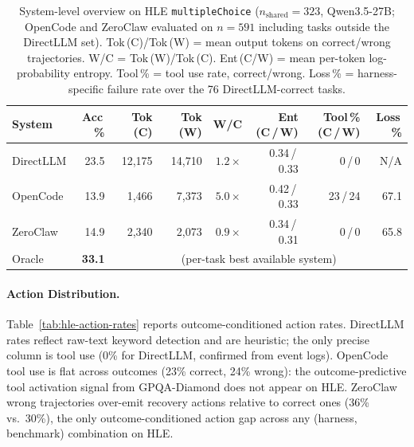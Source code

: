 \begin{table}[t]
\centering
\small
\caption{%
  System-level overview on HLE \texttt{multipleChoice} ($n_{\text{shared}}=323$,
  Qwen3.5-27B; OpenCode and ZeroClaw evaluated on $n=591$ including tasks
  outside the DirectLLM set).
  Tok\,(C)/Tok\,(W) = mean output tokens on correct/wrong trajectories.
  W/C = Tok\,(W)/Tok\,(C).
  Ent\,(C/W) = mean per-token log-probability entropy.
  Tool\,\% = tool use rate, correct/wrong.
  Loss\,\% = harness-specific failure rate over the 76 DirectLLM-correct tasks.
}
\label{tab:hle-overview}
\setlength{\tabcolsep}{3pt}
\begin{tabular}{lrrrrrrr}
\toprule
System & Acc\,\% & Tok (C) & Tok (W) & W/C & Ent (C\,/\,W) & Tool\,\% (C\,/\,W) & Loss\,\% \\
\midrule
DirectLLM &  23.5 & 12{,}175 & 14{,}710 & $1.2{\times}$ & 0.34\,/\,0.33 & 0\,/\,0    & N/A  \\
OpenCode  &  13.9 &  1{,}466 &  7{,}373 & $5.0{\times}$ & 0.42\,/\,0.33 & 23\,/\,24  & 67.1 \\
ZeroClaw  &  14.9 &  2{,}340 &  2{,}073 & $0.9{\times}$ & 0.34\,/\,0.31 & 0\,/\,0    & 65.8 \\
\midrule
Oracle    &  \textbf{33.1} & \multicolumn{6}{c}{(per-task best available system)} \\
\bottomrule
\end{tabular}
\end{table}

\paragraph{Action Distribution.}
Table~\ref{tab:hle-action-rates} reports outcome-conditioned action rates.
DirectLLM rates reflect raw-text keyword detection and are heuristic;
the only precise column is tool use (0\% for DirectLLM, confirmed from
event logs).
OpenCode tool use is flat across outcomes (23\% correct, 24\% wrong): the
outcome-predictive tool activation signal from GPQA-Diamond does not appear
on HLE.
ZeroClaw wrong trajectories over-emit recovery actions relative to correct
ones (36\% vs.\ 30\%), the only outcome-conditioned action gap across any
(harness, benchmark) combination on HLE.

